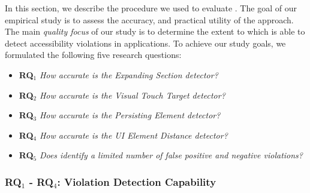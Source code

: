 









In this section, we describe the procedure we used to evaluate \MotorEase. The goal of our empirical study is to assess the accuracy, and practical utility of the approach. The main \textit{quality focus} of our study is to determine the extent to which \MotorEase is able to detect accessibility violations in applications.
To achieve our study goals, we formulated the following five research questions: 
\begin{itemize}
		\item{\textbf{RQ$_1$} \textit{How accurate is the Expanding Section detector?}}
		\item{\textbf{RQ$_2$} \textit{How accurate is the Visual Touch Target detector?}}
        \item{\textbf{RQ$_3$} \textit{How accurate is the Persisting Element detector?}}
        \item{\textbf{RQ$_4$} \textit{How accurate is the UI Element Distance detector?}}
		\item{\textbf{RQ$_5$} \textit{Does \MotorEase identify a limited number of false positive and negative violations?}}
\end{itemize}
        
\subsubsection{RQ$_1$ - RQ$_4$: Violation Detection Capability}
 
